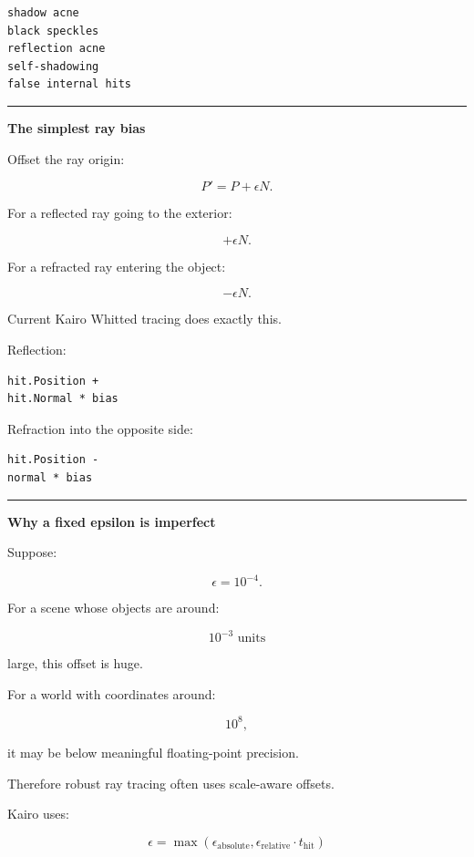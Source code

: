 \begin{verbatim}
shadow acne
black speckles
reflection acne
self-shadowing
false internal hits
\end{verbatim}

\begin{center}\rule{0.5\linewidth}{0.5pt}\end{center}

\textbf{The simplest ray bias}

Offset the ray origin:

\[
\boxed{
P'=P+\epsilon N.
}
\]

For a reflected ray going to the exterior:

\[
+\epsilon N.
\]

For a refracted ray entering the object:

\[
-\epsilon N.
\]

Current Kairo Whitted tracing does exactly this.

Reflection:

\begin{verbatim}
hit.Position +
hit.Normal * bias
\end{verbatim}

Refraction into the opposite side:

\begin{verbatim}
hit.Position -
normal * bias
\end{verbatim}

\begin{center}\rule{0.5\linewidth}{0.5pt}\end{center}

\textbf{Why a fixed epsilon is imperfect}

Suppose:

\[
\epsilon=10^{-4}.
\]

For a scene whose objects are around:

\[
10^{-3}\text{ units}
\]

large, this offset is huge.

For a world with coordinates around:

\[
10^8,
\]

it may be below meaningful floating-point precision.

Therefore robust ray tracing often uses scale-aware offsets.

Kairo uses:

\[
\boxed{
\epsilon=
\max(
\epsilon_{\text{absolute}},
\epsilon_{\text{relative}}\cdot t_{\text{hit}}
)
}
\]

